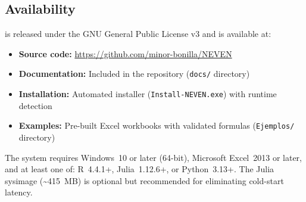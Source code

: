 \subsection{Availability}

\neven{} is released under the GNU General Public License v3 and is available at:
\begin{itemize}
    \item \textbf{Source code:} \url{https://github.com/minor-bonilla/NEVEN}
    \item \textbf{Documentation:} Included in the repository (\texttt{docs/} directory)
    \item \textbf{Installation:} Automated installer (\texttt{Install-NEVEN.exe}) with runtime detection
    \item \textbf{Examples:} Pre-built Excel workbooks with validated formulas (\texttt{Ejemplos/} directory)
\end{itemize}

The system requires Windows~10 or later (64-bit), Microsoft Excel~2013 or later, and at least one of: R~4.4.1+, Julia~1.12.6+, or Python~3.13+. The Julia sysimage (\textasciitilde415~MB) is optional but recommended for eliminating cold-start latency.
